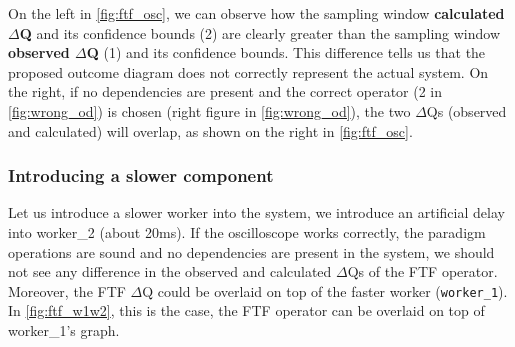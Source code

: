             On the left in \cref{fig:ftf_osc}, we can observe how the sampling window \textbf{calculated $\Delta$Q} and its confidence bounds (2) are clearly greater than the sampling window \textbf{observed $\Delta$Q} (1) and its confidence bounds. This difference tells us that the proposed outcome diagram does not correctly represent the actual system. On the right, if no dependencies are present and the correct operator (2 in \cref{fig:wrong_od}) is chosen (right figure in \cref{fig:wrong_od}), the two $\Delta$Qs (observed and calculated) will overlap, as shown on the right in \cref{fig:ftf_osc}.

                  \subsubsection{Introducing a slower component}
            Let us introduce a slower worker into the system, we introduce an artificial delay into worker\_2 (about 20ms). If the oscilloscope works correctly, the paradigm operations are sound and no dependencies are present in the system, we should not see any difference in the observed and calculated $\Delta$Qs of the FTF operator. Moreover, the FTF $\Delta$Q could be overlaid on top of the faster worker (\texttt{worker\_1}). In \cref{fig:ftf_w1w2}, this is the case, the FTF operator can be overlaid on top of worker\_1's graph. 

